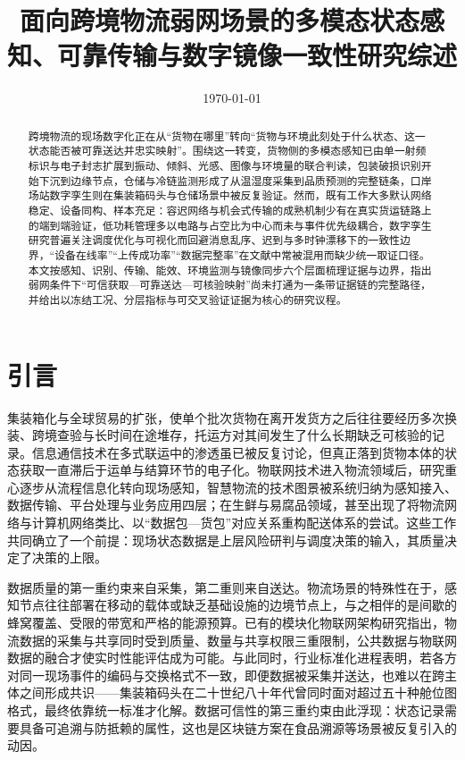 \documentclass[11pt,a4paper]{article}
\title{面向跨境物流弱网场景的多模态状态感知、可靠传输与数字镜像一致性研究综述}
\author{}
\date{\today}
\begin{document}
\maketitle
\setcounter{secnumdepth}{3}

\begin{abstract}
跨境物流的现场数字化正在从“货物在哪里”转向“货物与环境此刻处于什么状态、这一状态能否被可靠送达并忠实映射”。围绕这一转变，货物侧的多模态感知已由单一射频标识与电子封志扩展到振动、倾斜、光感、图像与环境量的联合判读，包装破损识别开始下沉到边缘节点，仓储与冷链监测形成了从温湿度采集到品质预测的完整链条，口岸场站数字孪生则在集装箱码头与仓储场景中被反复验证。然而，既有工作大多默认网络稳定、设备同构、样本充足：容迟网络与机会式传输的成熟机制少有在真实货运链路上的端到端验证，低功耗管理多以电路与占空比为中心而未与事件优先级耦合，数字孪生研究普遍关注调度优化与可视化而回避消息乱序、迟到与多时钟漂移下的一致性边界，“设备在线率”“上传成功率”“数据完整率”在文献中常被混用而缺少统一取证口径。本文按感知、识别、传输、能效、环境监测与镜像同步六个层面梳理证据与边界，指出弱网条件下“可信获取—可靠送达—可核验映射”尚未打通为一条带证据链的完整路径，并给出以冻结工况、分层指标与可交叉验证证据为核心的研究议程。
\end{abstract}

\section{引言}

集装箱化与全球贸易的扩张，使单个批次货物在离开发货方之后往往要经历多次换装、跨境查验与长时间在途堆存，托运方对其间发生了什么长期缺乏可核验的记录。信息通信技术在多式联运中的渗透虽已被反复讨论，但真正落到货物本体的状态获取一直滞后于运单与结算环节的电子化\cite{doijijpe201409005}。物联网技术进入物流领域后，研究重心逐步从流程信息化转向现场感知，智慧物流的技术图景被系统归纳为感知接入、数据传输、平台处理与业务应用四层\cite{doi1367556720201757053}；在生鲜与易腐品领域，甚至出现了将物流网络与计算机网络类比、以“数据包—货包”对应关系重构配送体系的尝试\cite{doiaccess20192894126}。这些工作共同确立了一个前提：现场状态数据是上层风险研判与调度决策的输入，其质量决定了决策的上限。

数据质量的第一重约束来自采集，第二重则来自送达。物流场景的特殊性在于，感知节点往往部署在移动的载体或缺乏基础设施的边境节点上，与之相伴的是间歇的蜂窝覆盖、受限的带宽和严格的能源预算。已有的模块化物联网架构研究指出，物流数据的采集与共享同时受到质量、数量与共享权限三重限制，公共数据与物联网数据的融合才使实时性能评估成为可能\cite{doisu16020742}。与此同时，行业标准化进程表明，若各方对同一现场事件的编码与交换格式不一致，即便数据被采集并送达，也难以在跨主体之间形成共识——集装箱码头在二十世纪八十年代曾同时面对超过五十种舱位图格式，最终依靠统一标准才化解\cite{doipbtr034ech3}。数据可信性的第三重约束由此浮现：状态记录需要具备可追溯与防抵赖的属性，这也是区块链方案在食品溯源等场景被反复引入的动因\cite{doiaccess20192940227}。
\end{document}
